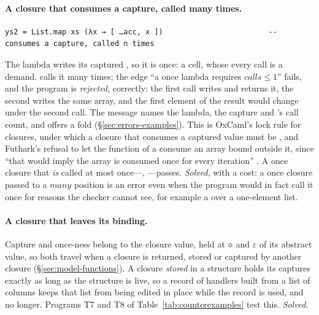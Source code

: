 \paragraph{A closure that consumes a capture, called many times.}
\begin{Verbatim}
ys2 = List.map xs (λx → [ …acc, x ])                        -- consumes a capture, called n times
\end{Verbatim}
The lambda writes its captured , so it is once: a cell, whose every call is a demand. 
calls it many times; the edge ``a once lambda requires $\mathit{calls} \le 1$'' fails, and the program is
\emph{rejected}, correctly: the first call writes  and returns it, the second writes the same
array, and the first element of the result would change under the second call. The message names the
lambda, the capture and 's call count, and offers a fold (\S\ref{sec:errors-examples}). This
is OxCaml's lock rule for closures, under which a closure that consumes a captured value must be
 \citep[\S3.3]{lorenzen2024oxidizing}, and Futhark's refusal to let the function of a
 consume an array bound outside it, since ``that would imply the array is consumed once for
every iteration'' \citep[\S3.3]{henriksen2017futhark}. A once closure that \emph{is} called at most
once---, ---passes.
\emph{Solved}, with a cost: a once closure passed to a $\mathit{many}$ position is an error even when the
program would in fact call it once for reasons the checker cannot see, for example a  over
a one-element list.

\paragraph{A closure that leaves its binding.} Capture and once-ness belong to the closure value, held
at $\diamond$ and $\varepsilon$ of its abstract value, so both travel when a closure is returned, stored or
captured by another closure (\S\ref{sec:model-functions}). A closure \emph{stored} in a structure holds
its captures exactly as long as the structure is live, so a record of handlers built from a list of
columns keeps that list from being edited in place while the record is used, and no longer. Programs T7
and T8 of Table~\ref{tab:counterexamples} test this. \emph{Solved.}


